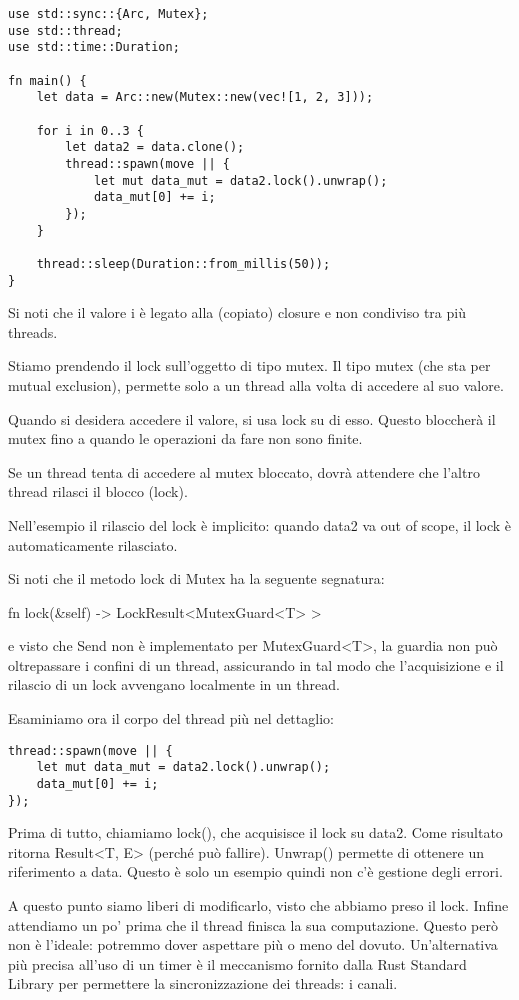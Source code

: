 \begin{lstlisting}
use std::sync::{Arc, Mutex};
use std::thread;
use std::time::Duration;

fn main() {
    let data = Arc::new(Mutex::new(vec![1, 2, 3]));

    for i in 0..3 {
        let data2 = data.clone();
        thread::spawn(move || {
            let mut data_mut = data2.lock().unwrap();
            data_mut[0] += i;
        });
    }

    thread::sleep(Duration::from_millis(50));
}
\end{lstlisting}

Si noti che il valore i è legato alla (copiato) closure e non condiviso
tra più threads.

Stiamo prendendo il lock sull’oggetto di tipo mutex.
Il tipo mutex (che sta per mutual exclusion), permette solo a un thread alla
volta di accedere al suo valore.

Quando si desidera accedere il valore, si usa lock su di esso. Questo
bloccherà il mutex fino a quando le operazioni da fare non sono finite.

Se un thread tenta di accedere al mutex bloccato, dovrà attendere che l’altro
thread rilasci il blocco (lock).

Nell’esempio il rilascio del lock è implicito: quando data2 va out of scope,
il lock è automaticamente rilasciato.

Si noti che il metodo lock di Mutex ha la seguente segnatura:

fn lock(\&self) -> LockResult<MutexGuard<T> >

e visto che Send non è implementato per MutexGuard<T>, la guardia non può
oltrepassare i confini di un thread, assicurando in tal modo che
l’acquisizione e il rilascio di un lock avvengano localmente in un thread.

Esaminiamo ora il corpo del thread più nel dettaglio:

\begin{lstlisting}
thread::spawn(move || {
    let mut data_mut = data2.lock().unwrap();
    data_mut[0] += i;
});
\end{lstlisting}

Prima di tutto, chiamiamo lock(), che acquisisce il lock su data2.
Come risultato ritorna Result<T, E> (perché può fallire).
Unwrap() permette di ottenere un riferimento a data. Questo è solo un esempio
quindi non c’è gestione degli errori.

A questo punto siamo liberi di modificarlo, visto che abbiamo preso il lock.
Infine attendiamo un po’ prima che il thread finisca la sua computazione.
Questo però non è l’ideale: potremmo dover aspettare più o meno del dovuto.
Un'alternativa più precisa all’uso di un timer è il meccanismo fornito dalla
Rust Standard Library per permettere la sincronizzazione dei threads: i canali.


